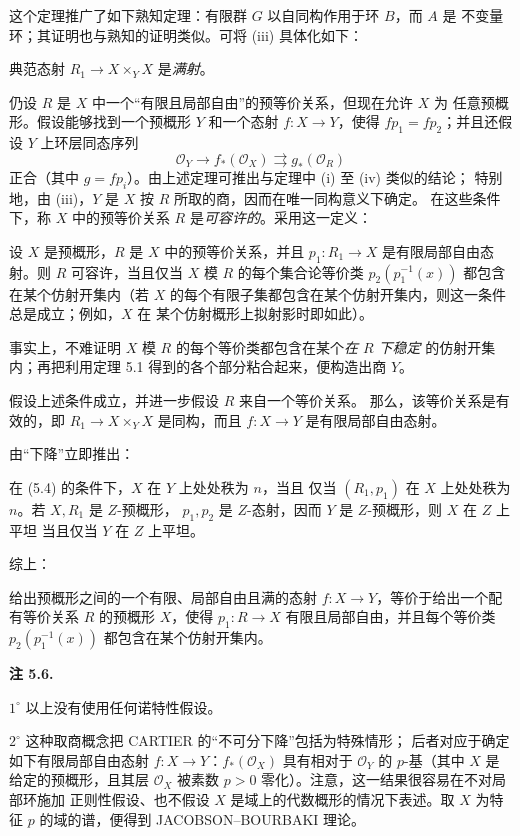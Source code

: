 这个定理推广了如下熟知定理：有限群 $G$ 以自同构作用于环 $B$，而 $A$ 是
不变量环；其证明也与熟知的证明类似。可将 (iii) 具体化如下：

 典范态射
$R_1\to X\times_Y X$ 是\emph{满射}。

仍设 $R$ 是 $X$ 中一个“有限且局部自由”的预等价关系，但现在允许 $X$ 为
任意预概形。假设能够找到一个预概形 $Y$ 和一个态射 $f:X\to Y$，使得
$fp_1=fp_2$；并且还假设 $Y$ 上环层同态序列
\[
  \mathcal O_Y\longrightarrow f_*(\mathcal O_X)
  \rightrightarrows g_*(\mathcal O_R)
\]
正合（其中 $g=fp_i$）。由上述定理可推出与定理中 (i) 至 (iv) 类似的结论；
特别地，由 (iii)，$Y$ 是 $X$ 按 $R$ 所取的商，因而在唯一同构意义下确定。
在这些条件下，称 $X$ 中的预等价关系 $R$ 是\emph{可容许的}。采用这一定义：

 设 $X$ 是预概形，$R$ 是 $X$ 中的预等价关系，并且
$p_1:R_1\to X$ 是有限局部自由态射。则 $R$ 可容许，当且仅当 $X$ 模 $R$
的每个集合论等价类 $p_2(p_1^{-1}(x))$ 都包含在某个仿射开集内（若 $X$
的每个有限子集都包含在某个仿射开集内，则这一条件总是成立；例如，$X$ 在
某个仿射概形上拟射影时即如此）。

事实上，不难证明 $X$ 模 $R$ 的每个等价类都包含在某个\emph{在 $R$ 下稳定}
的仿射开集内；再把利用定理 5.1 得到的各个部分粘合起来，便构造出商 $Y$。

 假设上述条件成立，并进一步假设 $R$ 来自一个等价关系。
那么，该等价关系是有效的，即 $R_1\to X\times_Y X$ 是同构，而且
$f:X\to Y$ 是有限局部自由态射。

由“下降”立即推出：

 在 (5.4) 的条件下，$X$ 在 $Y$ 上处处秩为 $n$，当且
仅当 $(R_1,p_1)$ 在 $X$ 上处处秩为 $n$。若 $X,R_1$ 是 $Z$-预概形，
$p_1,p_2$ 是 $Z$-态射，因而 $Y$ 是 $Z$-预概形，则 $X$ 在 $Z$ 上平坦
当且仅当 $Y$ 在 $Z$ 上平坦。

综上：

 给出预概形之间的一个有限、局部自由且满的态射
$f:X\to Y$，等价于给出一个配有等价关系 $R$ 的预概形 $X$，使得
$p_1:R\to X$ 有限且局部自由，并且每个等价类
$p_2(p_1^{-1}(x))$ 都包含在某个仿射开集内。

\medskip
\noindent\textbf{注 5.6.}

\smallskip
\noindent $1^\circ$ 以上没有使用任何诺特性假设。

\smallskip
\noindent $2^\circ$ 这种取商概念把 CARTIER 的“不可分下降”包括为特殊情形；
后者对应于确定如下有限局部自由态射 $f:X\to Y$：$f_*(\mathcal O_X)$
具有相对于 $\mathcal O_Y$ 的 $p$-基（其中 $X$ 是给定的预概形，且其层
$\mathcal O_X$ 被素数 $p>0$ 零化）。注意，这一结果很容易在不对局部环施加
正则性假设、也不假设 $X$ 是域上的代数概形的情况下表述。取 $X$ 为特征
$p$ 的域的谱，便得到 JACOBSON--BOURBAKI 理论。

